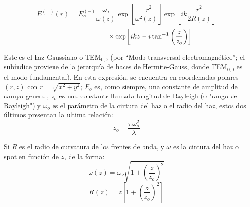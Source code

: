 \documentclass[11pt,letterpaper,twocolumn]{article}
\begin{document}
$$E^{(+)}(r)=E_{o}^{(+)} \dfrac{\omega_{o}}{\omega (z)} \exp\left[\dfrac{-r^{2}}{\omega^{2}(z)}\right] \exp\left[ ik\dfrac{r^{2}}{2R(z)}\right]$$
\begin{equation}
\hspace*{2.5 cm}\times \exp \left[ ikz-i\tan^{-1}\left(\dfrac{z}{z_{o}}\right) \right] 
\label{1}
\end{equation}
\par 
Este es el haz Gaussiano o TEM$_{0,0}$ (por “Modo transversal electromagnético”; el subíndice proviene de la jerarquía de haces de Hermite-Gauss, donde TEM$_{0,0}$ es el modo fundamental). En esta expresión, se encuentra en coordenadas polares $(r,z)$ con $r=\sqrt{x^2 + y^2}$; $E_{o}$ es, como siempre, una constante de amplitud de campo general; $z_{o}$ es una constante llamada longitud de Rayleigh (o "rango de Rayleigh") y $\omega_{o}$ es el parámetro de la cintura del haz o el radio del haz, estos dos últimos presentan la ultima relación: 
$$z_{o}=\dfrac{\pi \omega_{o}^{2}}{\lambda}$$
\par 
Si $R$ es el radio de curvatura de los frentes de onda, y $\omega$ es la cintura del haz o spot en función de $z$, de la forma:
\begin{equation}
\omega(z)=\omega_{o} \sqrt{ 1 + \left( \dfrac{z}{z_{o}}\right) ^{2}}
\end{equation}
$$R(z)=z \left[ 1+ \left( \dfrac{z}{z_{o}} \right)^{2}\right]$$
\end{document}
